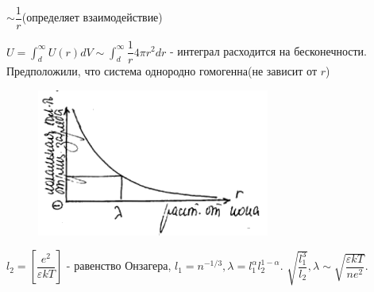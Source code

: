 \begin{lecture}
\begin{lecSection}
$\sim \dfrac{1}{r}$(определяет взаимодействие)
\par $U = \int_{d}^{\infty} U(r)dV \sim \int_{d}^{\infty} \dfrac{1}{r} 4 \pi r^2 dr$ - интеграл расходится на бесконечности. Предположили, что система однородно гомогенна(не зависит от $r$)	

\begin{figure}[H]
	
	\centering\includegraphics[width=0.6\linewidth]{lecture_09/new_pic8}
	
\end{figure}
	
	$l_2 = \left[\dfrac{e^2}{\varepsilon k T}\right]$ - равенство Онзагера, $l_1 = n^{-1/3}, \lambda = l_1^\alpha l_2^{1- \alpha}$. $\sqrt{\dfrac{l_1^3}{l_2}}, \lambda \sim \sqrt{\dfrac{\varepsilon k T}{n e^2}}.$
	
\end{lecSection}
			
\end{lecture}